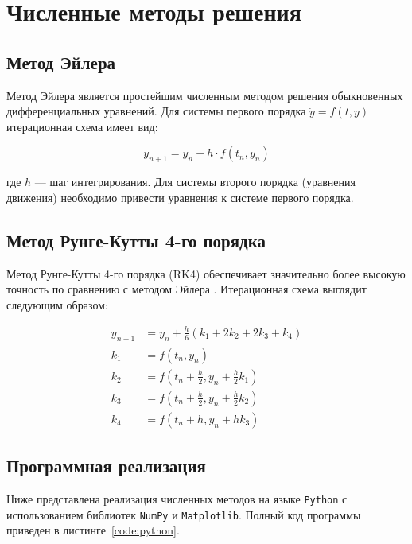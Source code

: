 \section{Численные методы решения}

\subsection{Метод Эйлера}

Метод Эйлера является простейшим численным методом решения обыкновенных дифференциальных уравнений. Для системы первого порядка \(\dot{y} = f(t, y)\) итерационная схема имеет вид:

\begin{equation}
    y_{n+1} = y_n + h \cdot f(t_n, y_n)
    \label{eq:euler}
\end{equation}

где \(h\) — шаг интегрирования. Для системы второго порядка (уравнения движения) необходимо привести уравнения к системе первого порядка.

\subsection{Метод Рунге-Кутты 4-го порядка}

Метод Рунге-Кутты 4-го порядка (RK4) обеспечивает значительно более высокую точность по сравнению с методом Эйлера \cite{kalitkin2021}. Итерационная схема выглядит следующим образом:

\begin{equation}
\begin{aligned}
    y_{n+1} &= y_n + \frac{h}{6}(k_1 + 2k_2 + 2k_3 + k_4) \\
    k_1 &= f(t_n, y_n) \\
    k_2 &= f(t_n + \frac{h}{2}, y_n + \frac{h}{2}k_1) \\
    k_3 &= f(t_n + \frac{h}{2}, y_n + \frac{h}{2}k_2) \\
    k_4 &= f(t_n + h, y_n + h k_3)
\end{aligned}
\label{eq:rk4}
\end{equation}

\subsection{Программная реализация}

Ниже представлена реализация численных методов на языке \texttt{Python} с использованием библиотек \texttt{NumPy} и \texttt{Matplotlib}. Полный код программы приведен в листинге~\ref{code:python}.

